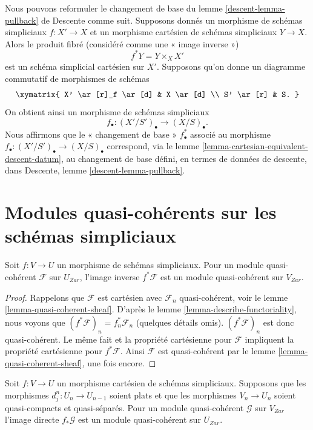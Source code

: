 \noindent
Nous pouvons reformuler le changement de base du
lemme \ref{descent-lemma-pullback} de Descente comme suit.
Supposons donnés un morphisme de schémas simpliciaux $f : X' \to X$ et un morphisme cartésien
de schémas simpliciaux $Y \to X$. Alors
le produit fibré (considéré comme une « image inverse »)
$$
f^*Y = Y \times_X X'
$$
est un schéma simplicial cartésien sur $X'$.
Supposons qu'on donne un diagramme commutatif de morphismes de schémas
$$
\xymatrix{
X' \ar[r]_f \ar[d] & X \ar[d] \\
S' \ar[r] & S.
}
$$
On obtient ainsi un morphisme de schémas simpliciaux
$$
f_\bullet : (X'/S')_\bullet \longrightarrow (X/S)_\bullet.
$$
Nous affirmons que le « changement de base » $f_\bullet^*$ associé au morphisme
$f_\bullet : (X'/S')_\bullet \to (X/S)_\bullet$ correspond, via
le lemme \ref{lemma-cartesian-equivalent-descent-datum},
au changement de base défini, en termes de données de descente, dans
Descente, lemme
\ref{descent-lemma-pullback}.







\section{Modules quasi-cohérents sur les schémas simpliciaux}
\label{section-modules-simplicial}

\begin{lemma}
\label{lemma-pullback-cartesian-module}
Soit $f : V \to U$ un morphisme de schémas simpliciaux. Pour un
module quasi-cohérent $\mathcal{F}$ sur $U_{Zar}$, l'image inverse
$f^*\mathcal{F}$ est un module quasi-cohérent sur $V_{Zar}$.
\end{lemma}

\begin{proof}
Rappelons que $\mathcal{F}$ est cartésien avec $\mathcal{F}_n$
quasi-cohérent, voir le lemme \ref{lemma-quasi-coherent-sheaf}.
D'après le lemme \ref{lemma-describe-functoriality}, nous voyons que
$(f^*\mathcal{F})_n = f_n^*\mathcal{F}_n$ (quelques détails omis).
$(f^*\mathcal{F})_n$ est donc quasi-cohérent.
Le même fait et la propriété cartésienne pour $\mathcal{F}$
impliquent la propriété cartésienne pour $f^*\mathcal{F}$.
Ainsi $\mathcal{F}$ est quasi-cohérent par
le lemme \ref{lemma-quasi-coherent-sheaf}, une fois encore.
\end{proof}

\begin{lemma}
\label{lemma-pushforward-cartesian-module}
Soit $f : V \to U$ un morphisme cartésien de schémas simpliciaux.
Supposons que les morphismes $d^n_j : U_n \to U_{n - 1}$ soient
plats et que les morphismes $V_n \to U_n$ soient quasi-compacts et quasi-séparés.
Pour un module quasi-cohérent $\mathcal{G}$ sur $V_{Zar}$
l'image directe $f_*\mathcal{G}$ est un module quasi-cohérent sur $U_{Zar}$.
\end{lemma}

